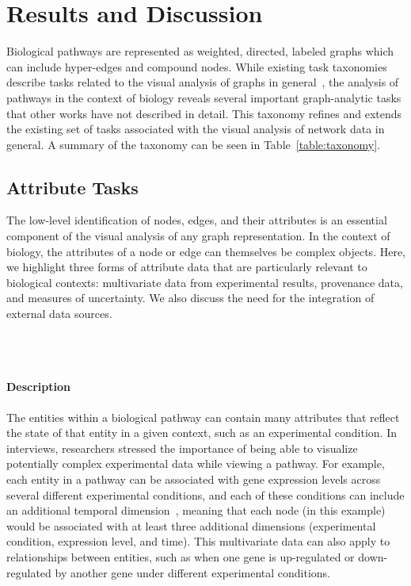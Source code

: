 \documentclass[twocolumn]{bmcart}%
\begin{document}
\section*{Results and Discussion}

Biological pathways are represented as weighted, directed, labeled graphs which can include hyper-edges and compound nodes.
While existing task taxonomies describe tasks related to the visual analysis of graphs in general~\cite{Ahn2014, Pretorius2014}, the analysis of pathways in the context of biology reveals several important graph-analytic tasks that other works have not described in detail.
This taxonomy refines and extends the existing set of tasks associated with the visual analysis of network data in general.
A summary of the taxonomy can be seen in Table~\ref{table:taxonomy}.

\subsection*{Attribute Tasks}

The low-level identification of nodes, edges, and their attributes is an essential component of the visual analysis of any graph representation.
In the context of biology, the attributes of a node or edge can themselves be complex objects.
Here, we highlight three forms of attribute data that are particularly relevant to biological contexts: multivariate data from experimental results, provenance data, and measures of uncertainty.
We also discuss the need for the integration of external data sources.

\ \\ \
\paragraph*{Description}

The entities within a biological pathway can contain many attributes that reflect the state of that entity in a given context, such as an experimental condition.
In interviews, researchers stressed the importance of being able to visualize potentially complex experimental data while viewing a pathway.
For example, each entity in a pathway can be associated with gene expression levels across several different experimental conditions, and each of these conditions can include an additional temporal dimension~\cite{Barsky2008cerebral}, meaning that each node (in this example) would be associated with at least three additional dimensions (experimental condition, expression level, and time).
This multivariate data can also apply to relationships between entities, such as when one gene is up-regulated or down-regulated by another gene under different experimental conditions.
\end{document}
